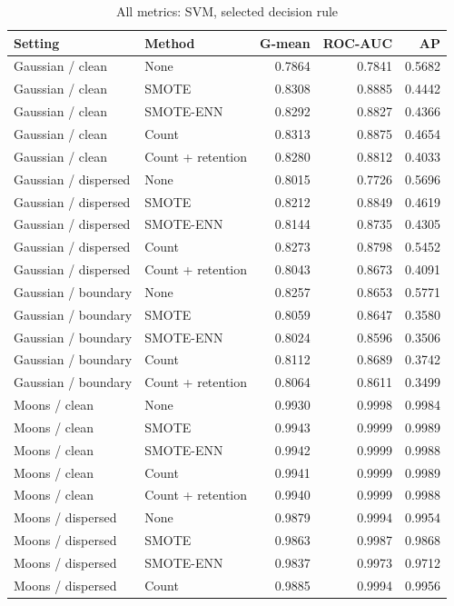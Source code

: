 \begin{table}[htbp]
\caption{All metrics: SVM, selected decision rule}
\centering\small
\begin{tabular}{llrrr}
\hline
Setting & Method & G-mean & ROC-AUC & AP\\
\hline
Gaussian / clean & None & 0.7864 & 0.7841 & 0.5682 \\
Gaussian / clean & SMOTE & 0.8308 & 0.8885 & 0.4442 \\
Gaussian / clean & SMOTE-ENN & 0.8292 & 0.8827 & 0.4366 \\
Gaussian / clean & Count & 0.8313 & 0.8875 & 0.4654 \\
Gaussian / clean & Count + retention & 0.8280 & 0.8812 & 0.4033 \\
Gaussian / dispersed & None & 0.8015 & 0.7726 & 0.5696 \\
Gaussian / dispersed & SMOTE & 0.8212 & 0.8849 & 0.4619 \\
Gaussian / dispersed & SMOTE-ENN & 0.8144 & 0.8735 & 0.4305 \\
Gaussian / dispersed & Count & 0.8273 & 0.8798 & 0.5452 \\
Gaussian / dispersed & Count + retention & 0.8043 & 0.8673 & 0.4091 \\
Gaussian / boundary & None & 0.8257 & 0.8653 & 0.5771 \\
Gaussian / boundary & SMOTE & 0.8059 & 0.8647 & 0.3580 \\
Gaussian / boundary & SMOTE-ENN & 0.8024 & 0.8596 & 0.3506 \\
Gaussian / boundary & Count & 0.8112 & 0.8689 & 0.3742 \\
Gaussian / boundary & Count + retention & 0.8064 & 0.8611 & 0.3499 \\
Moons / clean & None & 0.9930 & 0.9998 & 0.9984 \\
Moons / clean & SMOTE & 0.9943 & 0.9999 & 0.9989 \\
Moons / clean & SMOTE-ENN & 0.9942 & 0.9999 & 0.9988 \\
Moons / clean & Count & 0.9941 & 0.9999 & 0.9989 \\
Moons / clean & Count + retention & 0.9940 & 0.9999 & 0.9988 \\
Moons / dispersed & None & 0.9879 & 0.9994 & 0.9954 \\
Moons / dispersed & SMOTE & 0.9863 & 0.9987 & 0.9868 \\
Moons / dispersed & SMOTE-ENN & 0.9837 & 0.9973 & 0.9712 \\
Moons / dispersed & Count & 0.9885 & 0.9994 & 0.9956 \\

\end{tabular}
\end{table}
